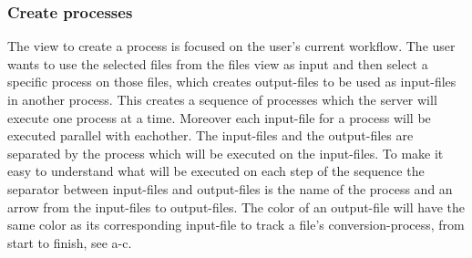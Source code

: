%
%


\subsubsection{Create processes}
The view to create a process is focused on the user's current workflow. The user wants to use the selected files from the files view as input and then select a specific process on those files, which creates output-files to be used as input-files in another process. This creates a sequence of processes which the server will execute one process at a time. Moreover each input-file for a process will be executed parallel with eachother. The input-files and the output-files are separated by the process which will be executed on the input-files. To make it easy to understand what will be executed on each step of the sequence the separator between input-files and output-files is the name of the process and an arrow from the input-files to output-files. The color of an output-file will have the same color as its corresponding input-file to track a file's conversion-process, from start to finish, see a-c. 



